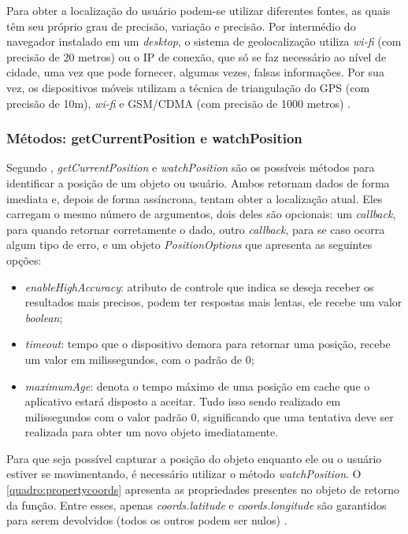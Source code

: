 Para obter a localização do usuário podem-se utilizar diferentes fontes, as quais têm seu próprio grau de precisão, variação e precisão. Por intermédio do navegador instalado em um \textit{desktop}, o sistema de geolocalização utiliza \textit{wi-fi} (com precisão de 20 metros) ou o IP de conexão, que só se faz necessário ao nível de cidade,  uma vez que pode fornecer, algumas vezes, falsas informações. Por sua vez, os dispositivos móveis utilizam a técnica de triangulação do GPS (com precisão de 10m), \textit{wi-fi} e GSM/CDMA (com precisão de 1000 metros) \cite{geolocalizacao:2011}.

\subsubsection{Métodos: getCurrentPosition e watchPosition}

Segundo , \textit{getCurrentPosition} e \textit{watchPosition} são os possíveis métodos para identificar a posição de um objeto ou usuário. Ambos retornam dados de forma imediata e, depois de forma assíncrona, tentam obter a localização atual. Eles carregam o mesmo número de argumentos, dois deles são opcionais: um \textit{callback}, para quando retornar corretamente o dado, outro \textit{callback}, para se caso ocorra algum tipo de erro, e um objeto \textit{PositionOptions} que apresenta as seguintes opções:

\newpage
\begin{itemize}
    \item \textit{enableHighAccuracy}: atributo de controle que indica se deseja receber os resultados mais precisos, podem ter respostas mais lentas, ele recebe um valor \textit{boolean};
    \item \textit{timeout}: tempo que o dispositivo demora para retornar uma posição, recebe um valor em milissegundos, com o padrão de 0;
    \item \textit{maximumAge}: denota o tempo máximo de uma posição em cache que o aplicativo estará disposto a aceitar. Tudo isso sendo realizado em milissegundos com o valor padrão 0, significando que uma tentativa deve ser realizada para obter um novo objeto imediatamente.
\end{itemize}

Para que seja possível capturar a posição do objeto enquanto ele ou o usuário estiver se movimentando, é necessário utilizar o método \textit{watchPosition}. O \autoref{quadro:propertycoords} apresenta as propriedades presentes no objeto de retorno da função. Entre esses, apenas \textit{coords.latitude} e \textit{coords.longitude} são garantidos para serem devolvidos (todos os outros podem ser nulos) \cite{geolocalizacao:2011}.

